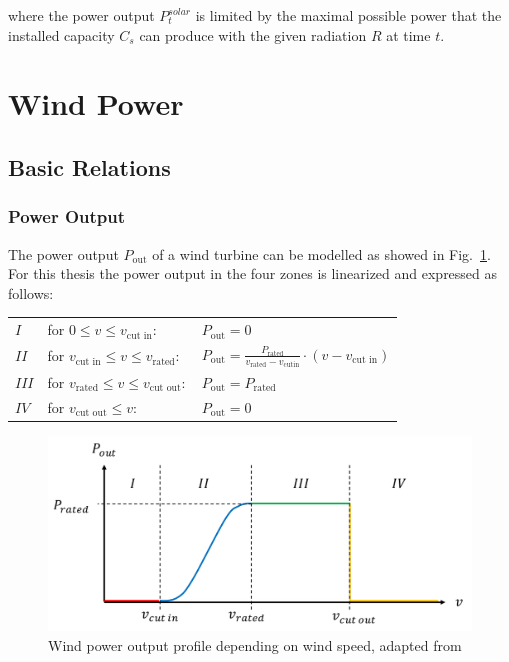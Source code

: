 \noindent where the power output $P^{solar}_{t}$ is limited by the maximal possible power that the installed capacity $C_s$ can produce with the given radiation $R$ at time $t$.

\section{Wind Power}
\subsection{Basic Relations}\label{chap:wind_basic_formulas}
\subsubsection{Power Output}
The power output $P_\text{out}$ of a wind turbine can be modelled as showed in Fig.~\ref{fig:wind_power_profile}. For this thesis the power output in the four zones is linearized and expressed as follows: 

\begin{tabular}{lll}
     $I$ & for $0 \leq v \leq v_\text{cut in}:$ & $P_\text{out} = 0$ \\
     $II$ & for $v_\text{cut in} \leq v \leq v_\text{rated}:$ & $P_\text{out} = \frac{P_\text{rated}}{v_\text{rated}-v_\text{cutin}} \cdot (v - v_\text{cut in}) $ \\
     $III$ & for $v_\text{rated} \leq v \leq v_\text{cut out}:$ & $P_\text{out} = P_\text{rated}$ \\
     $IV$ & for $v_\text{cut out} \leq v:$ & $P_\text{out} = 0$
\end{tabular}
    

\begin{figure}
    \centering
    \includegraphics[width = \textwidth]{figures/wind_power_output_profile.pdf}
    \caption{Wind power output profile depending on wind speed, adapted from \cite{windpower}}
    \label{fig:wind_power_profile}
\end{figure}

